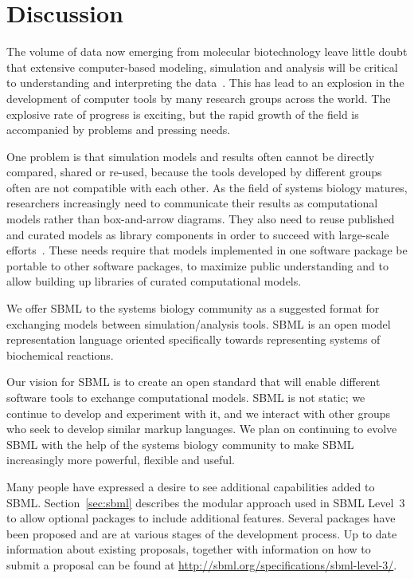 
\section{Discussion}
\label{sec:discussion}

The volume of data now emerging from molecular biotechnology leave
little doubt that extensive computer-based modeling, simulation
and analysis will be critical to understanding and interpreting
the data~\citep{abbott:1999,gilman:2000,popel:1998,smaglik:2000}.
This has lead to an explosion in the development of computer tools
by many research groups across the world.  The explosive rate of
progress is exciting, but the rapid growth of the field is
accompanied by problems and pressing needs.

One problem is that simulation models and results often cannot be
directly compared, shared or re-used, because the tools developed
by different groups often are not compatible with each other.  As
the field of systems biology matures, researchers increasingly
need to communicate their results as computational models rather
than box-and-arrow diagrams.  They also need to reuse published
and curated models as library components in order to succeed with
large-scale efforts~\citep[e.g., the Alliance for Cellular
Signaling;][]{gilman:2000,smaglik:2000}.  These needs require that
models implemented in one software package be portable to other
software packages, to maximize public understanding and to allow
building up libraries of curated computational models.

We offer SBML to the systems biology community as a suggested
format for exchanging models between simulation/analysis tools.
SBML is an open model representation language oriented
specifically towards representing systems of biochemical
reactions.

Our vision for SBML is to create an open standard that will enable
different software tools to exchange computational models.  SBML
is not static; we continue to develop and experiment with it, and
we interact with other groups who seek to develop similar markup
languages.  We plan on continuing to evolve SBML with the help of
the systems biology community to make SBML increasingly more
powerful, flexible and useful.


Many people have expressed a desire to see additional capabilities
added to SBML.  Section~\ref{sec:sbml} describes the modular approach 
used in SBML Level~3 to allow optional packages to include additional
features.  Several packages have been proposed and are at various 
stages of the development process.  Up to date information about existing
proposals, together with information on how to submit a proposal can be
found at \url{http://sbml.org/specifications/sbml-level-3/}.
 





